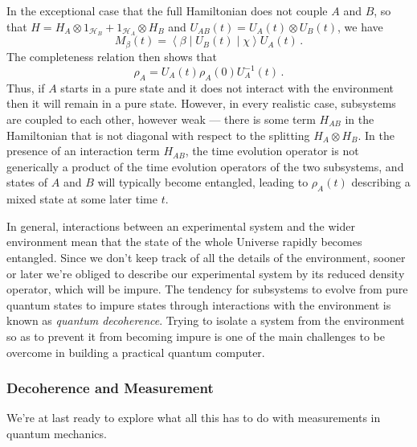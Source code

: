 \documentclass{article}
\theoremstyle{plain}\theoremheaderfont{\normalfont\itshape}\theorembodyfont{\rmfamily}\theoremseparator{.}\newtheorem*{rem}{Remark}\newtheorem*{ex}{Example}\newtheorem*{proof}{Proof}\newtheorem*{altp}{Alternative proof}
\theoremstyle{plain}\theoremheaderfont{\normalfont\bfseries}\theorembodyfont{\rmfamily}\theoremseparator{.}\newtheorem{thm}{Theorem}[section]\newtheorem{lem}[thm]{Lemma}\newtheorem{prop}[thm]{Proposition}\newtheorem*{cor}{Corollary}\newtheorem{defn}[thm]{Definition}\newtheorem{clm}[thm]{Claim}\newtheorem{clminproof}{Claim}
\theoremstyle{break}\theoremheaderfont{\normalfont\itshape}\theorembodyfont{\rmfamily}\theoremseparator{.\medskip}\newtheorem*{proofskip}{Proof}\newtheorem*{exs}{Examples}\newtheorem*{rems}{Remarks}
\theoremstyle{break}\theoremheaderfont{\normalfont\bfseries}\theorembodyfont{\rmfamily}\theoremseparator{.\medskip}\newtheorem{lemskip}[thm]{Lemma}\newtheorem{defnskip}[thm]{Definition}\newtheorem{propskip}[thm]{Proposition}\newtheorem{thmskip}[thm]{Theorem}
\numberwithin{equation}{section}
\newcommand{\mel}[3]{\left\langle #1 \middle| #2 \middle| #3 \right\rangle}
\newcommand{\hb}{\mathcal{H}}
\begin{document}
    In the exceptional case that the full Hamiltonian does not couple \(A\) and \(B\), so that \(H=H_A\otimes 1_{\hb_B}+1_{\hb_A}\otimes H_B\) and \(U_{AB}(t)=U_A(t)\otimes U_B(t)\), we have
    \begin{equation}
        M_\beta(t)=\mel{\beta}{U_B(t)}{\chi}U_A(t)\,.
    \end{equation}
    The completeness relation then shows that
    \begin{equation}
        \rho_A=U_A(t)\rho_A(0)U_A^{-1}(t)\,.
    \end{equation}
    Thus, if \(A\) starts in a pure state and it does not interact with the environment then it will remain in a pure state. However, in every realistic case, subsystems are coupled to each other, however weak --- there is some term \(H_{AB}\) in the Hamiltonian that is not diagonal with respect to the splitting \(H_A\otimes H_B\). In the presence of an interaction term \(H_{AB}\), the time evolution operator is not generically a product of the time evolution operators of the two subsystems, and states of \(A\) and \(B\) will typically become entangled, leading to \(\rho_A(t)\) describing a mixed state at some later time \(t\).
    
    In general, interactions between an experimental system and the wider environment mean that the state of the whole Universe rapidly becomes entangled. Since we don't keep track of all the details of the environment, sooner or later we're obliged to describe our experimental system by its reduced density operator, which will be impure. The tendency for subsystems to evolve from pure quantum states to impure states through interactions with the environment is known as \textit{quantum decoherence}. Trying to isolate a system from the environment so as to prevent it from becoming impure is one of the main challenges to be overcome in building a practical quantum computer.

    \subsubsection{Decoherence and Measurement}\label{Chap:Decoherence_Measurements}
    We're at last ready to explore what all this has to do with measurements in quantum mechanics.
\end{document}
